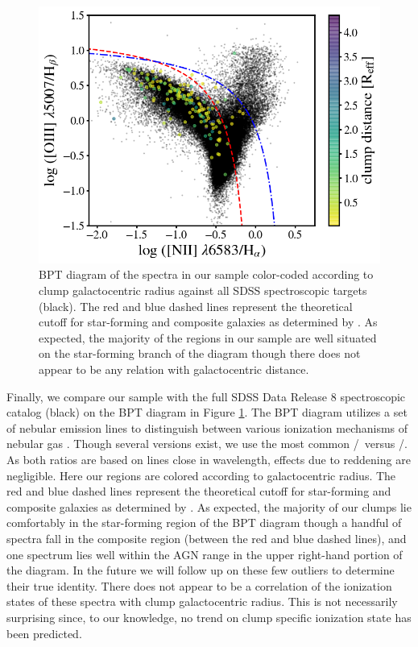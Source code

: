 \begin{figure}
\includegraphics[width=\textwidth]{Figures/bpt2.png}
\caption[BPT diagram of spectra in this sample compared to all SDSS spectroscopic targets.]{BPT diagram of the spectra in our sample color-coded according to clump galactocentric radius against all SDSS spectroscopic targets (black). The red and blue dashed lines represent the theoretical cutoff for star-forming and composite galaxies as determined by \citep{Kewley2006}. As expected, the majority of the regions in our sample are well situated on the star-forming branch of the diagram though there does not appear to be any relation with galactocentric distance.}
\label{fig: bpt}
\end{figure}

Finally, we compare our sample with the full SDSS Data Release 8 spectroscopic catalog (black) on the BPT diagram in Figure \ref{fig: bpt}. The BPT diagram utilizes a set of nebular emission lines to distinguish between various ionization mechanisms of nebular gas \citep{Baldwin1981}. Though several versions exist, we use the most common \oiii/\hb~versus \nii/\ha. As both ratios are based on lines close in wavelength, effects due to reddening are negligible. Here our regions are colored according to galactocentric radius. The red and blue dashed lines represent the theoretical cutoff for star-forming and composite galaxies as determined by \citep{Kewley2006}. As expected, the majority of our clumps lie comfortably in the star-forming region of the BPT diagram though a handful of spectra fall in the composite region (between the red and blue dashed lines), and one spectrum lies well within the AGN range in the upper right-hand portion of the diagram. In the future we will follow up on these few outliers to determine their true identity. There does not appear to be a correlation of the ionization states of these spectra with clump galactocentric radius. This is not necessarily surprising since, to our knowledge, no trend on clump specific ionization state has been predicted. 


